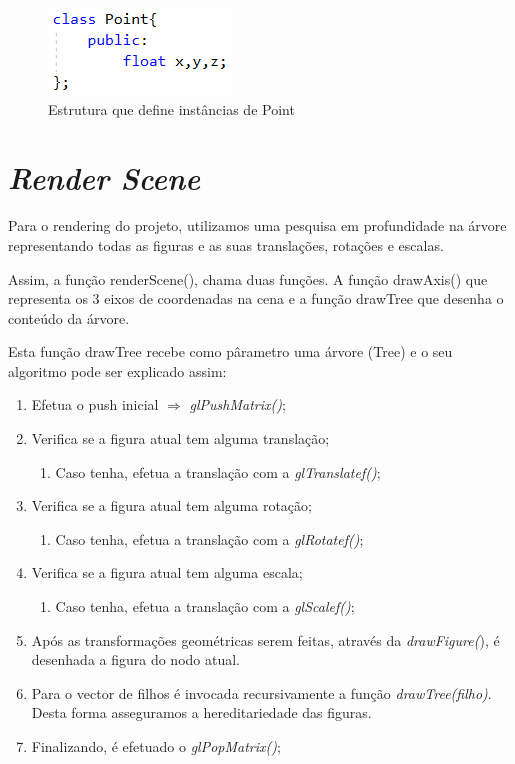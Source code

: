 \documentclass[a4paper]{article}
\begin{document}
\begin{figure}[H]
\centering
\includegraphics[scale=0.8]{point.png}
\caption{Estrutura que define instâncias de Point}
\label{img:Point}
\end{figure}


\newpage

\section{\textit{Render Scene}}
Para o rendering do projeto, utilizamos uma pesquisa em profundidade na árvore representando  todas as figuras e as suas translações, rotações e escalas.

Assim, a função renderScene(), chama duas funções. A função drawAxis() que representa os 3 eixos de coordenadas na cena e a função drawTree que desenha o conteúdo da árvore.

Esta função drawTree recebe como pârametro uma árvore (Tree) e o seu algoritmo pode ser explicado assim:


\ttfamily
\begin{enumerate}
 \item Efetua o push inicial  $\Rightarrow$ \textit{glPushMatrix()};
 \item Verifica se a figura atual tem alguma translação;
    \begin{enumerate}
      \item Caso tenha, efetua a translação com a \textit{glTranslatef()};
    \end{enumerate}
  \item Verifica se a figura atual tem alguma rotação;
    \begin{enumerate}
      \item Caso tenha, efetua a translação com a \textit{glRotatef()};
    \end{enumerate}
 \item Verifica se a figura atual tem alguma escala;
    \begin{enumerate}
      \item Caso tenha, efetua a translação com a \textit{glScalef()};
    \end{enumerate}
 \item Após as transformações geométricas serem feitas, através da \textit{drawFigure(}), é desenhada a figura do nodo atual.
 \item Para o vector de filhos é invocada recursivamente a função \emph{drawTree(filho)}. Desta forma asseguramos a hereditariedade das figuras.
 \item Finalizando, é efetuado o \textit{glPopMatrix()};
\end{enumerate}
\end{document}
